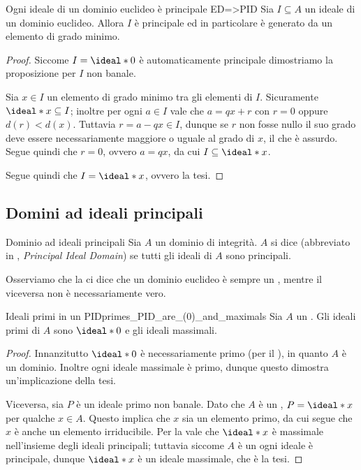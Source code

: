 \begin{proposition}
    {Ogni ideale di un dominio euclideo è principale} 
    {ED=>PID}
    Sia $I \subseteq A$ un ideale di un dominio euclideo. Allora $I$ è principale ed in particolare è generato da un elemento di grado minimo.
\end{proposition}
\begin{proof}
    Siccome $I = \ideal*{0}$ è automaticamente principale dimostriamo la proposizione per $I$ non banale.

    Sia $x \in I$ un elemento di grado minimo tra gli elementi di $I$. Sicuramente $\ideal*{x} \subseteq I$; inoltre per ogni $a \in I$ vale che $a = qx + r$ con $r = 0$ oppure $d(r) < d(x)$. Tuttavia $r = a - qx \in I$, dunque se $r$ non fosse nullo il suo grado deve essere necessariamente maggiore o uguale al grado di $x$, il che è assurdo. Segue quindi che $r = 0$, ovvero $a = qx$, da cui $I \subseteq \ideal*{x}$.
    
    Segue quindi che $I = \ideal*{x}$, ovvero la tesi.
\end{proof}

\subsection{Domini ad ideali principali}

\begin{definition}
    {Dominio ad ideali principali}
    Sia $A$ un dominio di integrità. $A$ si dice  (abbreviato in \PID, \emph{Principal Ideal Domain}) se tutti gli ideali di $A$ sono principali.
\end{definition}

Osserviamo che la  ci dice che un dominio euclideo è sempre un \PID, mentre il viceversa non è necessariamente vero.

\begin{proposition}
    {Ideali primi in un PID}{primes_PID_are_(0)_and_maximals}
    Sia $A$ un \PID. Gli ideali primi di $A$ sono $\ideal*{0}$ e gli ideali massimali.
\end{proposition}
\begin{proof}
    Innanzitutto $\ideal*{0}$ è necessariamente primo (per il ), in quanto $A$ è un dominio. Inoltre ogni ideale massimale è primo, dunque questo dimostra un'implicazione della tesi.

    Viceversa, sia $P$ è un ideale primo non banale. Dato che $A$ è un \PID, $P = \ideal*{x}$ per qualche $x \in A$. Questo implica che $x$ sia un elemento primo, da cui segue che $x$ è anche un elemento irriducibile. Per la  vale che $\ideal*{x}$ è massimale nell'insieme degli ideali principali; tuttavia siccome $A$ è un \PID ogni ideale è principale, dunque $\ideal*{x}$ è un ideale massimale, che è la tesi.
\end{proof}

